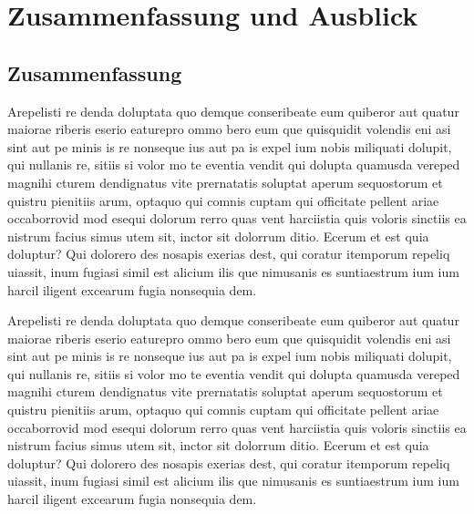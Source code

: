\chapter{Zusammenfassung und Ausblick}
\label{cha:Zusammenfassung und Ausblick}


\section{Zusammenfassung}
\label{sec:Zusammenfassung}
Arepelisti re denda doluptata quo demque conseribeate eum quiberor aut quatur maiorae riberis eserio eaturepro ommo bero eum que quisquidit volendis eni asi sint aut pe minis is re nonseque ius aut pa is expel ium nobis miliquati dolupit, qui nullanis re, sitiis si volor mo te eventia vendit qui dolupta quamusda vereped magnihi cturem dendignatus vite prernatatis soluptat aperum sequostorum et quistru pienitiis arum, optaquo qui comnis cuptam qui officitate pellent ariae occaborrovid mod esequi dolorum rerro quas vent harciistia quis voloris sinctiis ea nistrum facius simus utem sit, inctor sit dolorrum ditio. Ecerum et est quia doluptur? Qui dolorero des nosapis exerias dest, qui coratur itemporum repeliq uiassit, inum fugiasi simil est alicium ilis que nimusanis es suntiaestrum ium ium harcil iligent excearum fugia nonsequia dem.

Arepelisti re denda doluptata quo demque conseribeate eum quiberor aut quatur maiorae riberis eserio eaturepro ommo bero eum que quisquidit volendis eni asi sint aut pe minis is re nonseque ius aut pa is expel ium nobis miliquati dolupit, qui nullanis re, sitiis si volor mo te eventia vendit qui dolupta quamusda vereped magnihi cturem dendignatus vite prernatatis soluptat aperum sequostorum et quistru pienitiis arum, optaquo qui comnis cuptam qui officitate pellent ariae occaborrovid mod esequi dolorum rerro quas vent harciistia quis voloris sinctiis ea nistrum facius simus utem sit, inctor sit dolorrum ditio. Ecerum et est quia doluptur? Qui dolorero des nosapis exerias dest, qui coratur itemporum repeliq uiassit, inum fugiasi simil est alicium ilis que nimusanis es suntiaestrum ium ium harcil iligent excearum fugia nonsequia dem.

